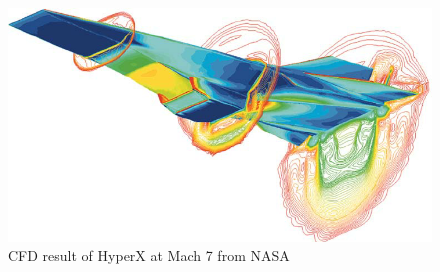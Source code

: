 \begin{frame}
\begin{center}
\begin{figure}
\includegraphics[scale=0.25]{CFD-NASA-HyperX.png}
\caption{CFD result of HyperX at Mach 7 from NASA}
\end{figure}
\end{center}
\end{frame}
